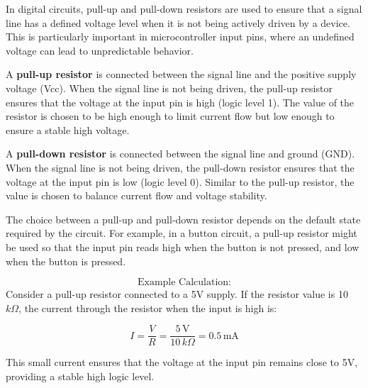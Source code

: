 In digital circuits, pull-up and pull-down resistors are used to ensure that a signal line has a defined voltage level when it is not being actively driven by a device. This is particularly important in microcontroller input pins, where an undefined voltage can lead to unpredictable behavior.

A \textbf{pull-up resistor} is connected between the signal line and the positive supply voltage (Vcc). When the signal line is not being driven, the pull-up resistor ensures that the voltage at the input pin is high (logic level 1). The value of the resistor is chosen to be high enough to limit current flow but low enough to ensure a stable high voltage.

A \textbf{pull-down resistor} is connected between the signal line and ground (GND). When the signal line is not being driven, the pull-down resistor ensures that the voltage at the input pin is low (logic level 0). Similar to the pull-up resistor, the value is chosen to balance current flow and voltage stability.

The choice between a pull-up and pull-down resistor depends on the default state required by the circuit. For example, in a button circuit, a pull-up resistor might be used so that the input pin reads high when the button is not pressed, and low when the button is pressed.

\[
\text{Example Calculation:}
\]
Consider a pull-up resistor connected to a 5V supply. If the resistor value is 10 $k\Omega$, the current through the resistor when the input is high is:

\[
I = \frac{V}{R} = \frac{5\,\text{V}}{10\,\text{$k\Omega$}} = 0.5\,\text{mA}
\]

This small current ensures that the voltage at the input pin remains close to 5V, providing a stable high logic level.

